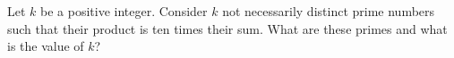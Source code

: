 \documentclass[varwidth]{standalone}
\begin{document}
    Let $k$ be a positive integer. Consider $k$ not necessarily distinct prime numbers such that their product is ten times their sum. What are these primes and what is the value of $k$?
\end{document}
